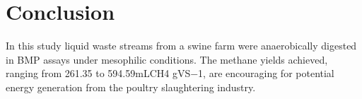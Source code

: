 \section{Conclusion}
In this study liquid waste streams from a swine farm were anaerobically digested in BMP assays under mesophilic conditions. The methane yields achieved, ranging from 261.35 to 594.59mLCH4 gVS−1, are encouraging for potential energy generation from the poultry slaughtering industry.